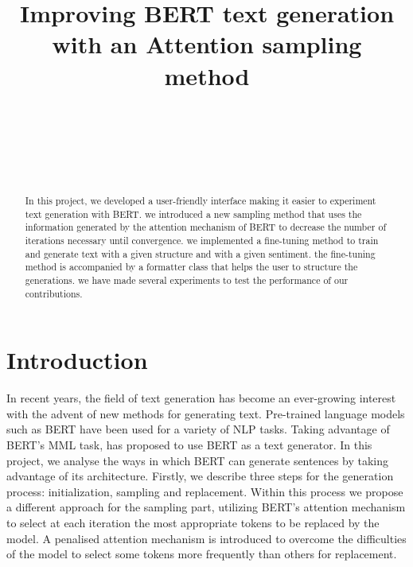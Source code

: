 \documentclass[10pt,twocolumn,letterpaper]{article}
\begin{document}
\title{Improving BERT text generation with an Attention sampling method}

\author{\\
\and
{}\\
\and
{}\\
}

\maketitle

\begin{abstract}
In this project, we developed a user-friendly interface making it easier
to experiment text generation with BERT. we introduced a new sampling method
that uses the information generated by the attention mechanism of BERT to decrease
the number of iterations necessary until convergence. we implemented a fine-tuning
method to train and generate text with a given structure and with a given sentiment.
the fine-tuning method is accompanied by a formatter class that helps the user to
structure the generations. we have made several experiments to test the performance of
our contributions.
\end{abstract}

\section{Introduction}

In recent years, the field of text generation has become an ever-growing interest
with the advent of new methods for generating text. Pre-trained language models
such as BERT have been used for a variety of NLP tasks. Taking advantage of BERT’s
MML task, \cite{wang2019bert} has proposed to use BERT as a text generator. In this project,
we analyse the ways in which BERT can generate sentences by taking advantage of its
architecture. Firstly, we describe three steps for the generation process: initialization,
sampling and replacement. Within this process we propose a different approach for the
sampling part, utilizing BERT’s attention mechanism to select at each iteration the most
appropriate tokens to be replaced by the model. A penalised attention mechanism is
introduced to overcome the difficulties of the model to select some tokens more frequently
than others for replacement.
\end{document}
